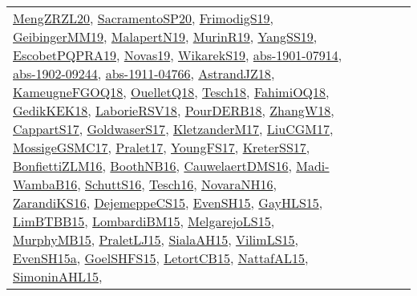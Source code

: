 {\begin{longtable}{llp{6cm}p{6cm}p{6cm}}
\href{articles/MengZRZL20.pdf}{MengZRZL20}\cite{MengZRZL20}, \href{articles/SacramentoSP20.pdf}{SacramentoSP20}\cite{SacramentoSP20}, \href{papers/FrimodigS19.pdf}{FrimodigS19}\cite{FrimodigS19}, \href{papers/GeibingerMM19.pdf}{GeibingerMM19}\cite{GeibingerMM19}, \href{papers/MalapertN19.pdf}{MalapertN19}\cite{MalapertN19}, \href{papers/MurinR19.pdf}{MurinR19}\cite{MurinR19}, \href{papers/YangSS19.pdf}{YangSS19}\cite{YangSS19}, \href{articles/EscobetPQPRA19.pdf}{EscobetPQPRA19}\cite{EscobetPQPRA19}, \href{articles/Novas19.pdf}{Novas19}\cite{Novas19}, \href{articles/WikarekS19.pdf}{WikarekS19}\cite{WikarekS19}, \href{articles/abs-1901-07914.pdf}{abs-1901-07914}\cite{abs-1901-07914}, \href{articles/abs-1902-09244.pdf}{abs-1902-09244}\cite{abs-1902-09244}, \href{articles/abs-1911-04766.pdf}{abs-1911-04766}\cite{abs-1911-04766}, \href{papers/AstrandJZ18.pdf}{AstrandJZ18}\cite{AstrandJZ18}, \href{papers/KameugneFGOQ18.pdf}{KameugneFGOQ18}\cite{KameugneFGOQ18}, \href{papers/OuelletQ18.pdf}{OuelletQ18}\cite{OuelletQ18}, \href{papers/Tesch18.pdf}{Tesch18}\cite{Tesch18}, \href{articles/FahimiOQ18.pdf}{FahimiOQ18}\cite{FahimiOQ18}, \href{articles/GedikKEK18.pdf}{GedikKEK18}\cite{GedikKEK18}, \href{articles/LaborieRSV18.pdf}{LaborieRSV18}\cite{LaborieRSV18}, \href{articles/PourDERB18.pdf}{PourDERB18}\cite{PourDERB18}, \href{articles/ZhangW18.pdf}{ZhangW18}\cite{ZhangW18}, \href{papers/CappartS17.pdf}{CappartS17}\cite{CappartS17}, \href{papers/GoldwaserS17.pdf}{GoldwaserS17}\cite{GoldwaserS17}, \href{papers/KletzanderM17.pdf}{KletzanderM17}\cite{KletzanderM17}, \href{papers/LiuCGM17.pdf}{LiuCGM17}\cite{LiuCGM17}, \href{papers/MossigeGSMC17.pdf}{MossigeGSMC17}\cite{MossigeGSMC17}, \href{papers/Pralet17.pdf}{Pralet17}\cite{Pralet17}, \href{papers/YoungFS17.pdf}{YoungFS17}\cite{YoungFS17}, \href{articles/KreterSS17.pdf}{KreterSS17}\cite{KreterSS17}, \href{papers/BonfiettiZLM16.pdf}{BonfiettiZLM16}\cite{BonfiettiZLM16}, \href{papers/BoothNB16.pdf}{BoothNB16}\cite{BoothNB16}, \href{papers/CauwelaertDMS16.pdf}{CauwelaertDMS16}\cite{CauwelaertDMS16}, \href{papers/Madi-WambaB16.pdf}{Madi-WambaB16}\cite{Madi-WambaB16}, \href{papers/SchuttS16.pdf}{SchuttS16}\cite{SchuttS16}, \href{papers/Tesch16.pdf}{Tesch16}\cite{Tesch16}, \href{articles/NovaraNH16.pdf}{NovaraNH16}\cite{NovaraNH16}, \href{articles/ZarandiKS16.pdf}{ZarandiKS16}\cite{ZarandiKS16}, \href{papers/DejemeppeCS15.pdf}{DejemeppeCS15}\cite{DejemeppeCS15}, \href{papers/EvenSH15.pdf}{EvenSH15}\cite{EvenSH15}, \href{papers/GayHLS15.pdf}{GayHLS15}\cite{GayHLS15}, \href{papers/LimBTBB15.pdf}{LimBTBB15}\cite{LimBTBB15}, \href{papers/LombardiBM15.pdf}{LombardiBM15}\cite{LombardiBM15}, \href{papers/MelgarejoLS15.pdf}{MelgarejoLS15}\cite{MelgarejoLS15}, \href{papers/MurphyMB15.pdf}{MurphyMB15}\cite{MurphyMB15}, \href{papers/PraletLJ15.pdf}{PraletLJ15}\cite{PraletLJ15}, \href{papers/SialaAH15.pdf}{SialaAH15}\cite{SialaAH15}, \href{papers/VilimLS15.pdf}{VilimLS15}\cite{VilimLS15}, \href{articles/EvenSH15a.pdf}{EvenSH15a}\cite{EvenSH15a}, \href{articles/GoelSHFS15.pdf}{GoelSHFS15}\cite{GoelSHFS15}, \href{articles/LetortCB15.pdf}{LetortCB15}\cite{LetortCB15}, \href{articles/NattafAL15.pdf}{NattafAL15}\cite{NattafAL15}, \href{articles/SimoninAHL15.pdf}{SimoninAHL15}\cite{SimoninAHL15}, 
\end{longtable}}
